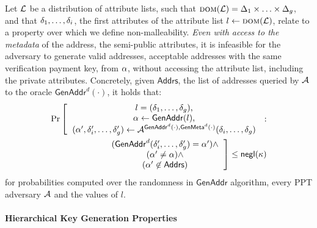 \begin{definition}\label{def:address_non_malleability}
    Let $\mathcal{L}$ be a distribution of attribute lists, such
    that $\textsc{dom}(\mathcal{L}) = \Delta_1 \times \ldots \times \Delta_g$, and that
    $\delta_{1},\dots,\delta_{i}$, \ie the first attributes of  the
    attribute list $l \leftarrow \textsc{dom}(\mathcal{L})$, relate
    to a property over which we define non-malleability. \emph{Even with access
    to the metadata} of the address, \ie the semi-public attributes, it is
    infeasible for the adversary to generate valid addresses, \ie acceptable
    addresses with the same verification payment key, from $\alpha$, without
    accessing the attribute list, including the private attributes.
    Concretely, given $\mathsf{Addrs}$, \ie the list of addresses queried by
    $\mathcal{A}$ to the oracle $\mathsf{GenAddr}^{d}(\cdot)$, it holds that:
    \begin{align}
        \Pr\left[
        \begin{tabular}{c}
        $l = (\attribute_{1}, \dots, \attribute_\addrgenlength)$, \\
        $\addr \leftarrow \mathsf{GenAddr}(l)$, \\
        $(\addr^\prime, \attribute^\prime_{i}, \dots, \attribute^\prime_\addrgenlength) \leftarrow \adv^{\mathsf{GenAddr}^{d}(\cdot), \mathsf{GenMeta}^{d}(\cdot)}(\attribute_{i}, \dots, \attribute_\addrgenlength)$ \\
        \end{tabular}
         \right. : \nonumber \\
        \left.
        \begin{tabular}{c}
        $(\mathsf{GenAddr}^d(\attribute^\prime_{i}, \dots, \attribute^\prime_\addrgenlength) = \addr^\prime) \wedge$ \\
        $(\addr^\prime\neq\addr) \wedge$ \\
        $(\addr^\prime \not \in \mathsf{Addrs})$ \\
        \end{tabular}
        \right]
        \leq \negl(\secparam) \nonumber
    \end{align}
    for probabilities computed over the randomness  in $\mathsf{GenAddr}$
    algorithm, every PPT adversary $\mathcal{A}$ and the values of $l$.
\end{definition}

\paragraph{Hierarchical Key Generation Properties}\label{subsec:hierarchical_keygen_properties}

